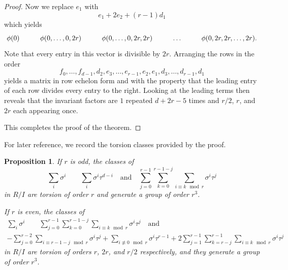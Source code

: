 \documentclass[reqno]{amsart}
\newtheorem{prop}[thm]{Proposition}
\theoremstyle{definition}
\theoremstyle{remark}
\begin{document}
\begin{proof}
Now we replace $e_1$ with 
$$e_1+2e_2+(r-1)d_1$$
which yields
$$\xymatrix{
\phi(0) &\phi(0,\dots,0,2r)&\phi(0,\dots,0,2r,2r)&
\dots&\phi(0,2r,2r,\dots,2r).
}$$
Note that every entry in this vector is divisible by $2r$.  
Arranging the rows in the order
$$f_0,\dots,f_{d-1},d_2,e_3,\dots,e_{r-1},e_2,e_1,d_3,\dots,d_{r-1},d_1$$
yields a matrix in row echelon form and with the property that the
leading entry of each row divides every entry to the right.  Looking
at the leading terms then reveals that the invariant factors are $1$
repeated $d+2r-5$ times and $r/2$, $r$, and $2r$ each appearing once.

This completes the proof of the theorem.
\end{proof}


For later reference, we record the torsion classes provided by the
proof.
\begin{prop}\label{prop:torsion-in-R/I}
If $r$ is odd, the classes of 
$$\sum_i\sigma^i\qquad\sum_i\sigma^i\tau^{d-i}\quad\text{and}\quad
\sum_{j=0}^{r-1}\sum_{k=0}^{r-1-j}\sum_{i\equiv k\mod r}\sigma^i\tau^j$$
in $R/I$ are torsion of order $r$ and generate a group of order $r^3$.

If $r$ is even, the classes of
\begin{multline*}
\sum_i\sigma^i\qquad
\sum_{j=0}^{r-1}\sum_{k=0}^{r-1-j}\sum_{i\equiv k\mod r}\sigma^i\tau^j
\quad\text{and}\quad\\
-\sum_{j=0}^{r-2}\sum_{i\equiv r-1-j\mod r}\sigma^i\tau^j
+\sum_{i\not\equiv0\mod r}\sigma^i\tau^{r-1}
+2\sum_{j=1}^{r-1}\sum_{k=r-j}^{r-1}\sum_{i\equiv k\mod
  r}\sigma^i\tau^j
\end{multline*}
in $R/I$ are torsion of orders $r$, $2r$, and $r/2$ respectively, and
they generate a group of order $r^3$.
\end{prop}
\end{document}
